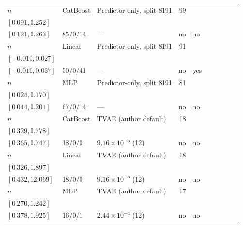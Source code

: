 \begin{longtable}{@{}ll>{\raggedright\arraybackslash}p{1.1in}rllrlll@{}}
$n$ & CatBoost & Predictor-only, split 8191 & 99 & \begin{tabular}[t]{@{}l@{}}$0.179$\\\tiny$[0.091, 0.252]$\end{tabular} & \begin{tabular}[t]{@{}l@{}}$0.199$\\\tiny$[0.121, 0.263]$\end{tabular} & 85/0/14 & --- & no & no \\
$n$ & Linear & Predictor-only, split 8191 & 91 & \begin{tabular}[t]{@{}l@{}}$0.004$\\\tiny$[-0.010, 0.027]$\end{tabular} & \begin{tabular}[t]{@{}l@{}}$0.007$\\\tiny$[-0.016, 0.037]$\end{tabular} & 50/0/41 & --- & no & yes \\
$n$ & MLP & Predictor-only, split 8191 & 81 & \begin{tabular}[t]{@{}l@{}}$0.101$\\\tiny$[0.024, 0.170]$\end{tabular} & \begin{tabular}[t]{@{}l@{}}$0.133$\\\tiny$[0.044, 0.201]$\end{tabular} & 67/0/14 & --- & no & no \\
$n$ & CatBoost & TVAE (author default) & 18 & \begin{tabular}[t]{@{}l@{}}$0.452$\\\tiny$[0.329, 0.778]$\end{tabular} & \begin{tabular}[t]{@{}l@{}}$0.504$\\\tiny$[0.365, 0.747]$\end{tabular} & 18/0/0 & $9.16\times 10^{-5}$ (12) & no & no \\
$n$ & Linear & TVAE (author default) & 18 & \begin{tabular}[t]{@{}l@{}}$0.593$\\\tiny$[0.326, 1.897]$\end{tabular} & \begin{tabular}[t]{@{}l@{}}$0.628$\\\tiny$[0.432, 12.069]$\end{tabular} & 18/0/0 & $9.16\times 10^{-5}$ (12) & no & no \\
$n$ & MLP & TVAE (author default) & 17 & \begin{tabular}[t]{@{}l@{}}$0.632$\\\tiny$[0.270, 1.242]$\end{tabular} & \begin{tabular}[t]{@{}l@{}}$0.748$\\\tiny$[0.378, 1.925]$\end{tabular} & 16/0/1 & $2.44\times 10^{-4}$ (12) & no & no \\

\end{longtable}
